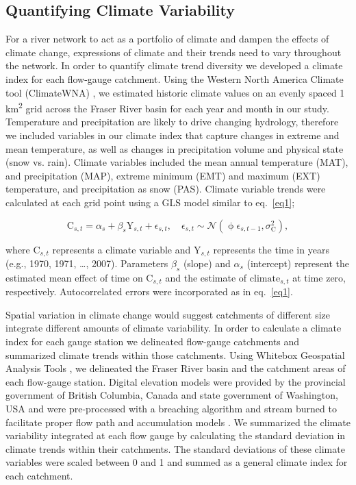 \documentclass[draft,linenumbers]{AGUJournal}
\begin{document}
\subsection{Quantifying Climate Variability}

For a river network to act as a portfolio of climate and dampen the effects of climate change, expressions of climate and their trends need to vary throughout the network. In order to quantify climate trend diversity we developed a climate index for each flow-gauge catchment. Using the Western North America Climate tool (ClimateWNA) \citep{Wang:2016}, we estimated historic climate values on an evenly spaced 1 km\textsuperscript{2} grid across the Fraser River basin for each year and month in our study. Temperature and precipitation are likely to drive changing hydrology, therefore we included variables in our climate index that capture changes in extreme and mean temperature, as well as changes in precipitation volume and physical state (snow vs. rain). Climate variables included the mean annual temperature (MAT), and precipitation (MAP), extreme minimum (EMT) and maximum (EXT) temperature, and precipitation as snow (PAS). Climate variable trends were calculated at each grid point using a GLS model similar to eq.~\ref{eq1};
\begin{linenomath*}
\begin{equation}
	\mathrm{C}_{s,t} = \alpha_s + \beta_s \mathrm{Y}_{s,t} + \epsilon_{s,t}, \quad 
  \epsilon_{s,t} \sim \mathcal{N}(\upphi \epsilon_{s,t-1}, \sigma_\mathrm{C}^2) \label{eq2},
\end{equation}
\end{linenomath*}
where $\mathrm{C}_{s,t}$ represents a climate variable and $\mathrm{Y}_{s,t}$ represents the time in years (e.g., 1970, 1971, \ldots, 2007). Parameters $\beta_{s}$ (slope) and $\alpha_{s}$ (intercept) represent the estimated mean effect of time on $\mathrm{C}_{s,t}$ and the estimate of $\mathrm{climate}_{s,t}$ at time zero, respectively. Autocorrelated errors were incorporated as in eq.~\ref{eq1}.
	
	Spatial variation in climate change would suggest catchments of different size integrate different amounts of climate variability. In order to calculate a climate index for each gauge station we delineated flow-gauge catchments and summarized climate trends within those catchments. Using Whitebox Geospatial Analysis Tools \citep{Lindsay:2016}, we delineated the Fraser River basin and the catchment areas of each flow-gauge station. Digital elevation models were provided by the provincial government of British Columbia, Canada and state government of Washington, USA and were pre-processed with a breaching algorithm and stream burned to facilitate proper flow path and accumulation models \citep{Woodrow:2016}. We summarized the climate variability integrated at each flow gauge by calculating the standard deviation in climate trends within their catchments. The standard deviations of these climate variables were scaled between 0 and 1 and summed as a general climate index for each catchment. 
\end{document}
